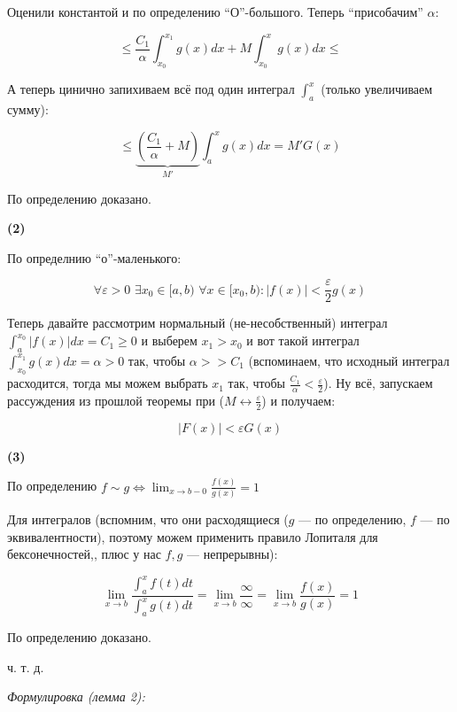 \documentclass{article}
\def\dbl{\,\,}
\begin{document}
Оценили константой и по определению ``О''-большого. Теперь ``присобачим'' $\alpha$:

\[\le \frac{C_1}{\alpha} \int_{x_0}^{x_1}g(x) dx + M\int_{x_0}^x g(x) dx \le \]

А теперь цинично запихиваем всё под один интеграл $\int_a^x$ (только увеличиваем сумму):

\[\le \underbrace{\left(\frac{C_1}{\alpha} + M\right)}_{M'} \int_{a}^x g(x) dx = M'G(x)\]

По определению доказано.

\textbf{(2)}

По определнию ``о''-маленького: 

\[\forall \varepsilon > 0 \dbl \exists x_0 \in [a, b) \dbl \forall x \in [x_0, b): |f(x)| < \frac{\varepsilon}{2}g(x) \]

Теперь давайте рассмотрим нормальный (не-несобственный) интеграл $\int_a^{x_0} |f(x)| dx = C_1 \ge 0$ и выберем $x_1 > x_0$ и вот такой интеграл $\int_{x_0}^{x_1} g(x) dx = \alpha > 0$ так, чтобы $\alpha >> C_1$ (вспоминаем, что исходный интеграл расходится, тогда мы можем выбрать $x_1$ так, чтобы $\frac{C_1}{\alpha} < \frac{\varepsilon}{2}$). Ну всё, запускаем рассуждения из прошлой теоремы при ($M \leftrightarrow \frac{\varepsilon}{2}$) и получаем:

\[|F(x)| < \varepsilon G(x)\]

\textbf{(3)}

По определению $f \sim g \Leftrightarrow \lim_{x \rightarrow b - 0} \frac{f(x)}{g(x)} = 1$

Для интегралов (вспомним, что они расходящиеся ($g$ --- по определению, $f$ --- по эквивалентности), поэтому можем применить правило Лопиталя для бексонечностей,, плюс у нас $f, g$ --- непрерывны):

\[\lim_{x \rightarrow b} \frac{\int_a^x f(t) dt}{\int_a^x g(t) dt} = \lim_{x \rightarrow b} \frac{\infty}{\infty} = \lim_{x \rightarrow b}\frac{f(x)}{g(x)} = 1\]

По определению доказано.

ч. т. д. 

\textit{Формулировка (лемма 2):}
\end{document}
